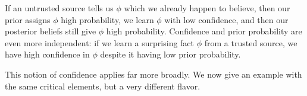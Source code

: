 \begin{example}
If an untrusted source tells us $\phi$ which we already happen to believe, 
then our prior assigns $\phi$ high probability,
we learn $\phi$ with low confidence,
and then our posterior beliefs still give $\phi$ high probability.  
Confidence and prior probability are even more independent: 
if we learn a surprising fact $\phi$ from a trusted source, we have high confidence in $\phi$ despite it having low prior probability.
\end{example}


This notion of confidence applies far more broadly.
We now give an example with the same critical elements,
but a very different flavor.

